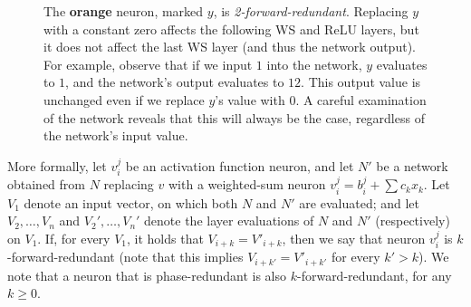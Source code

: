 \documentclass[10pt, conference, twocolumn, compsocconf]{IEEEtran}
\theoremstyle{remark}
\newcommand{\relu}{\text{ReLU}\xspace}
\newcommand{\kfr}{$k$-forward-redundant}
\begin{document}
\begin{figure}[htp]
{
}

\caption {The \textcolor{color1}{\textbf{orange}} \relu{} neuron, marked $y$,
is \emph{2-forward-redundant}.
Replacing $y$ with a constant zero affects the following WS and ReLU layers,
but it does not affect the last WS layer (and thus the network output).
For example, observe that if we input $1$ into the network, $y$
evaluates to $1$, and the network's output evaluates to $12$. This
output value is unchanged even 
if we replace $y$'s value with $0$. A careful examination of the
network reveals that this will always be the case, regardless of the
network's input value.}
\label{fig:forward-red-example}
\end{figure}

More formally, let $v_i^j$ be an activation function neuron, and let
$N'$ be a network obtained from $N$ replacing $v$ with a weighted-sum neuron
$v_i^j = b_i^j + \sum c_kx_k$. Let $V_1$ denote an input vector, on which
both $N$ and $N'$ are evaluated; and let $V_2,\ldots, V_n$ and
$V_2',\ldots, V_n'$ denote the layer evaluations of $N$ and $N'$
(respectively) on
 $V_1$. If, for every $V_1$, it holds that
$V_{i+k}=V'_{i+k}$, then we say that neuron $v_i^j$ is \kfr{}
(note that this implies $V_{i+k'}=V'_{i+k'}$ for every $k'>k$).  We
note that a neuron that is phase-redundant is also \kfr{}, for any
$k\geq 0$.
\end{document}
